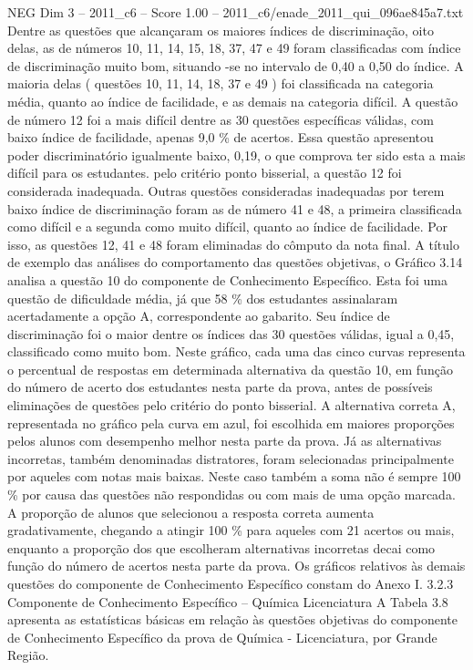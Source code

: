 \begin{textsample}{NEG Dim 3 – 2011\_c6 – Score 1.00 – 2011\_c6/enade\_2011\_qui\_096ae845a7.txt}
Dentre as questões que alcançaram os maiores índices de discriminação, oito delas, as de números 10, 11, 14, 15, 18, 37, 47 e 49 foram classificadas com índice de discriminação muito bom, situando -se no intervalo de 0,40 a 0,50 do índice.
A maioria delas ( questões 10, 11, 14, 18, 37 e 49 ) foi classificada na categoria média, quanto ao índice de facilidade, e as demais na categoria difícil.
A questão de número 12 foi a mais difícil dentre as 30 questões específicas válidas, com baixo índice de facilidade, apenas 9,0 \% de acertos.
Essa questão apresentou poder discriminatório igualmente baixo, 0,19, o que comprova ter sido esta a mais difícil para os estudantes. pelo critério ponto bisserial, a questão 12 foi considerada inadequada.
Outras questões consideradas inadequadas por terem baixo índice de discriminação foram as de número 41 e 48, a primeira classificada como difícil e a segunda como muito difícil, quanto ao índice de facilidade.
Por isso, as questões 12, 41 e 48 foram eliminadas do cômputo da nota final.
A título de exemplo das análises do comportamento das questões objetivas, o Gráfico 3.14 analisa a questão 10 do componente de Conhecimento Específico.
Esta foi uma questão de dificuldade média, já que 58 \% dos estudantes assinalaram acertadamente a opção A, correspondente ao gabarito.
Seu índice de discriminação foi o maior dentre os índices das 30 questões válidas, igual a 0,45, classificado como muito bom.
Neste gráfico, cada uma das cinco curvas representa o percentual de respostas em determinada alternativa da questão 10, em função do número de acerto dos estudantes nesta parte da prova, antes de possíveis eliminações de questões pelo critério do ponto bisserial.
A alternativa correta A, representada no gráfico pela curva em azul, foi escolhida em maiores proporções pelos alunos com desempenho melhor nesta parte da prova.
Já as alternativas incorretas, também denominadas distratores, foram selecionadas principalmente por aqueles com notas mais baixas.
Neste caso também a soma não é sempre 100 \% por causa das questões não respondidas ou com mais de uma opção marcada.
A proporção de alunos que selecionou a resposta correta aumenta gradativamente, chegando a atingir 100 \% para aqueles com 21 acertos ou mais, enquanto a proporção dos que escolheram alternativas incorretas decai como função do número de acertos nesta parte da prova.
Os gráficos relativos às demais questões do componente de Conhecimento Específico constam do Anexo I. 3.2.3 Componente de Conhecimento Específico – Química Licenciatura A Tabela 3.8 apresenta as estatísticas básicas em relação às questões objetivas do componente de Conhecimento Específico da prova de Química - Licenciatura, por Grande Região.

\end{textsample}
